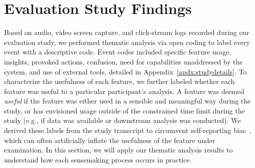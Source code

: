  \section{Evaluation Study Findings\label{sec:eval_findings}}
 Based on audio, video screen capture,
 and click-stream logs recorded
 during our  evaluation study,
 we performed thematic analysis via open coding to label every event with a descriptive code. Event codes included specific feature usage,
 insights,
 provoked actions, confusion,
 need for capabilities unaddressed
 by the system, and use of external tools, detailed in Appendix~\ref{apdx:studydetails}. To characterize the usefulness
 of each feature, we further labeled whether each
 feature was useful to a particular participant's analysis.
 A feature was deemed \textit{useful}
 if the feature was either used in a sensible
 and meaningful way  during the study,
 or has envisioned usage outside of the constrained
 time limit during the study
 (e.g., if data was available or downstream analysis was conducted).
 We derived these labels from the study transcript
 to circumvent self-reporting bias~\cite{Williams2017},
 which can often artificially inflate
 the usefulness of the feature under examination.
 In this section, we will apply our thematic analysis results to understand how each sensemaking process occurs in practice.%
